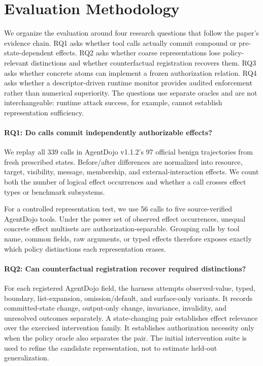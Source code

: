 \documentclass[letterpaper,twocolumn,10pt]{article}
\theoremstyle{definition}
\begin{document}
\section{Evaluation Methodology}
\label{sec:evaluation}

We organize the evaluation around four research questions that follow the
paper's evidence chain.  RQ1 asks whether tool calls actually commit compound
or pre-state-dependent effects.  RQ2 asks whether coarse representations lose
policy-relevant distinctions and whether counterfactual registration recovers
them.  RQ3 asks whether concrete atoms can implement a frozen authorization
relation.  RQ4 asks whether a descriptor-driven runtime monitor provides audited
enforcement rather than numerical superiority.  The questions use separate
oracles and are not interchangeable: runtime attack success, for example,
cannot establish representation sufficiency.

\paragraph{RQ1: Do calls commit independently authorizable effects?}
We replay all 339 calls in AgentDojo v1.1.2's 97 official benign trajectories
from fresh prescribed states.  Before/after differences are normalized into
resource, target, visibility, message, membership, and external-interaction
effects.  We count both the number of logical effect occurrences and whether a
call crosses effect types or benchmark subsystems.

For a controlled representation test, we use 56 calls to five source-verified
AgentDojo tools.  Under the power set of observed effect occurrences, unequal
concrete effect multisets are authorization-separable.  Grouping calls by tool
name, common fields, raw arguments, or typed effects therefore exposes exactly
which policy distinctions each representation erases.

\paragraph{RQ2: Can counterfactual registration recover required distinctions?}
For each registered AgentDojo field, the harness attempts observed-value,
typed, boundary, list-expansion, omission/default, and surface-only variants.
It records committed-state change, output-only change, invariance, invalidity,
and unresolved outcomes separately.  A state-changing pair establishes effect
relevance over the exercised intervention family.  It establishes
authorization necessity only when the policy oracle also separates the pair.
The initial intervention suite is used to refine the candidate representation,
not to estimate held-out generalization.
\end{document}
